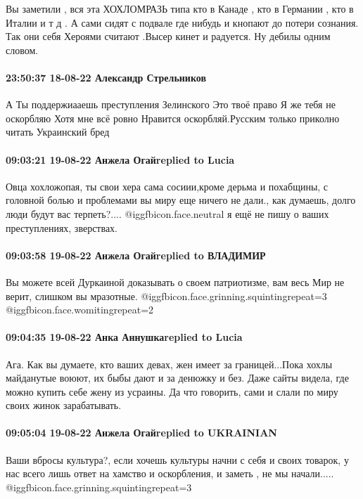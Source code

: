 Вы заметили , вся эта ХОХЛОМРАЗЬ типа кто в Канаде , кто в Германии , кто в
Италии и т д . А сами сидят с подвале где нибудь и кнопают до потери сознания.
Так они себя Хероями считают .Высер кинет и радуется. Ну дебилы одним словом.

\paragraph{23:50:37 18-08-22 Александр Стрельников}

А Ты поддержиааешь преступления Зелинского Это твоё право Я же тебя не
оскорбляю Хотя мне всё ровно Нравится оскорбляй.Русским только приколно читать
Украинский бред

\paragraph{09:03:21 19-08-22 Анжела Огайreplied to Lucia}

Овца хохложопая, ты свои хера сама сосиии,кроме дерьма и похабщины, с головной
болью и проблемами вы миру еще ничего не дали., как думаешь, долго люди будут
вас терпеть?.... @igg{fbicon.face.neutral} я ещё не пишу о ваших преступлениях, зверствах.

\paragraph{09:03:58 19-08-22 Анжела Огайreplied to ВЛАДИМИР}

Вы можете всей Дуркаиной доказывать о своем патриотизме, вам весь Мир не верит,
слишком вы мразотные. @igg{fbicon.face.grinning.squinting}{repeat=3}  @igg{fbicon.face.womiting}{repeat=2} 

\paragraph{09:04:35 19-08-22 Анка Аннушкаreplied to Lucia}

Ага. Как вы думаете, кто ваших девах, жен имеет за границей...Пока хохлы
майданутые воюют, их быбы дают и за денюжку и без. Даже сайты видела, где можно
купить себе жену из усраины. Да что говорить, сами и слали по миру своих жинок
зарабатывать.

\paragraph{09:05:04 19-08-22 Анжела Огайreplied to UKRAINIAN}

Ваши вбросы культура?, если хочешь культуры начни с себя и своих товарок, у нас
всего лишь ответ на хамство и оскорбления, и заметь , не мы начали.....
@igg{fbicon.face.grinning.squinting}{repeat=3} 

